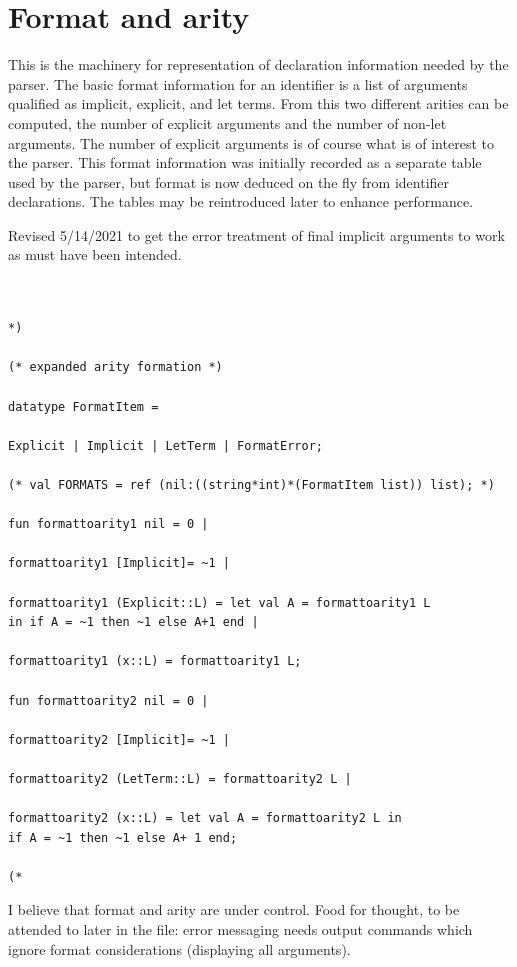 \documentclass[12pt]{article}
\begin{document}
\newpage

\section{Format and arity}

This is the machinery for representation of declaration information needed by the parser.  The basic format information for
an identifier is a list of arguments qualified as implicit, explicit, and let terms.  From this two different arities can be computed, the
number of explicit arguments and the number of non-let arguments.  The number of explicit arguments is of course what is of interest
to the parser.  This format information was initially recorded as a separate table used by the parser, but format is now deduced on the fly from
identifier declarations.  The tables may be reintroduced later to enhance performance.

Revised 5/14/2021 to get the error treatment of final implicit arguments to work as must have been intended.


\begin{verbatim}


*)

(* expanded arity formation *)

datatype FormatItem =

Explicit | Implicit | LetTerm | FormatError;

(* val FORMATS = ref (nil:((string*int)*(FormatItem list)) list); *)

fun formattoarity1 nil = 0 |

formattoarity1 [Implicit]= ~1 |

formattoarity1 (Explicit::L) = let val A = formattoarity1 L 
in if A = ~1 then ~1 else A+1 end |

formattoarity1 (x::L) = formattoarity1 L;

fun formattoarity2 nil = 0 |

formattoarity2 [Implicit]= ~1 |

formattoarity2 (LetTerm::L) = formattoarity2 L |

formattoarity2 (x::L) = let val A = formattoarity2 L in
if A = ~1 then ~1 else A+ 1 end;

(*

\end{verbatim}

I believe that format and arity are under control.  Food for thought, to be attended to later in the file:  error messaging needs output commands which ignore format considerations (displaying all arguments).
\end{document}
